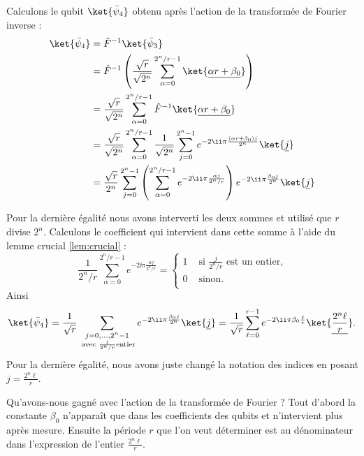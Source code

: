 \documentclass[11pt,class=report,crop=false]{standalone}
\begin{document}
Calculons le qubit $\ket{\bar \psi_4}$ obtenu après l'action de la transformée de Fourier inverse :
\begin{align*}
\ket{\bar \psi_4}
  &= {\hat F}^{-1} \ket{\bar \psi_3} \\
  &= {\hat F}^{-1} \left( \frac{\sqrt{r}}{\sqrt{2^n}} \sum_{\alpha=0}^{2^n/r-1} \ket{\underline{\alpha r + \beta_0}} \right) \\
  &=  \frac{\sqrt{r}}{\sqrt{2^n}} \sum_{\alpha=0}^{2^n/r-1} {\hat F}^{-1}\ket{\underline{\alpha r + \beta_0}} \\
  &= \frac{\sqrt{r}}{\sqrt{2^n}} 
     \sum_{\alpha=0}^{2^n/r-1} \frac{1}{\sqrt{2^n}} 
     \sum_{j=0}^{2^n-1} 
     e^{-2\ii \pi \frac{(\alpha r + \beta_0)j}{2^n}} 
     \ket{\underline j} \\  
&=  \frac{\sqrt{r}}{2^n} 
     \sum_{j=0}^{2^n-1} 
     \left(
     \sum_{\alpha=0}^{2^n/r-1} 
     e^{-2\ii \pi \frac{\alpha j}{2^n/r}} 
     \right) 
     e^{-2\ii \pi \frac{\beta_0 j}{2^n}} 
     \ket{\underline j} \\   
\end{align*}

Pour la dernière égalité nous avons interverti les deux sommes et utilisé que $r$ divise $2^n$.
Calculons le coefficient qui intervient dans cette somme à l'aide du lemme crucial \ref{lem:crucial} :
$$%
\frac{1}{2^n/r} \sum_{\alpha=0}^{2^n/r-1}  e^{-2\ii \pi \frac{\alpha j}{2^n/r}}
= \left\{ 
\begin{array}{rl}
1 & \text{ si } \frac{j}{2^n/r} \text{ est un entier,}\\
0 & \text{ sinon.} \\
\end{array}
\right.
$$
Ainsi 
$$\ket{\bar \psi_4}
= \frac1{\sqrt{r}} 
     \sum_{\substack{j=0,\ldots,2^n-1\\\text{ avec }  \frac{j}{2^n/r} \text{entier}}}
     e^{-2\ii \pi \frac{\beta_0 j}{2^n}} 
     \ket{\underline j} 
= \frac1{\sqrt{r}} 
     \sum_{\ell=0}^{r-1} 
     e^{-2\ii \pi \beta_0 \frac{\ell}{r}}
     \ket{\underline{\frac{2^n \ell}{r}}}. 
$$
Pour la dernière égalité, nous avons juste changé la notation des indices en posant $j=\frac{2^n\ell}{r}$.

Qu'avons-nous gagné avec l'action de la transformée de Fourier ? Tout d'abord la constante $\beta_0$ n'apparaît que dans les coefficients des qubits et n'intervient plus après mesure. Ensuite la période $r$ que l'on veut déterminer est au dénominateur dans l'expression de l'entier $\frac{2^n \ell}{r}$.
\end{document}
